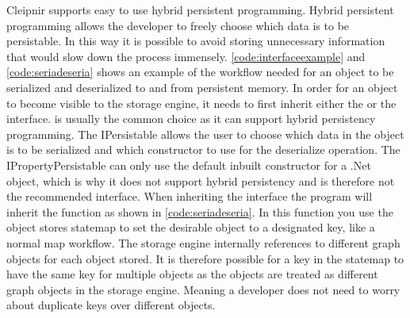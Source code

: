 Cleipnir supports easy to use hybrid persistent programming. Hybrid persistent programming allows the developer to freely choose which data is to be persistable. In this way it is possible to avoid storing unnecessary information that would slow down the process immensely. \autoref{code:interfaceexample} and \autoref{code:seriadeseria} shows an example of the workflow needed for an object to be serialized and deserialized to and from persistent memory. In order for an object to become visible to the storage engine, it needs to first inherit either the  or the  interface.  is usually the common choice as it can support hybrid persistency programming. The IPersistable allows the user to choose which data in the object is to be serialized and which constructor to use for the deserialize operation. The IPropertyPersistable can only use the default inbuilt constructor for a .Net object, which is why it does not support hybrid persistency and is therefore not the recommended interface. 
When inheriting the  interface the program will inherit the  function as shown in \autoref{code:seriadeseria}. In this function you use the object stores statemap to set the desirable object to a designated key, like a normal map workflow. The storage engine internally references to different graph objects for each object stored. It is therefore possible for a key in the statemap to have the same key for multiple objects as the objects are treated as different graph objects in the storage engine. Meaning a developer does not need to worry about duplicate keys over different objects. 

